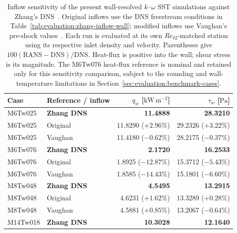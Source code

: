 \begin{table}[H]
    \centering
    \caption[Inflow sensitivity of wall-resolved SST wall loads]{Inflow sensitivity of the present wall-resolved \(k\)--\(\omega\) SST simulations against Zhang's DNS~\cite{zhang2018direct}. Original inflows use the DNS freestream conditions in Table~\ref{tab:evaluation:zhang-inflow-wall}; modified inflows use Vaughan's pre-shock values~\cite[Table~2.2]{vaughan2025thesis}. Each run is evaluated at its own \(Re_{\delta2}\)-matched station using its respective inlet density and velocity. Parentheses give \(100(\mathrm{RANS}-\mathrm{DNS})/\mathrm{DNS}\). Heat-flux is positive into the wall; shear stress is its magnitude. The M6Tw076 heat-flux reference is nominal and retained only for this sensitivity comparison, subject to the rounding and wall-temperature limitations in Section~\ref{sec:evaluation:benchmark-cases}.}
    \label{tab:inflow-comparison}
    \small
    \begin{tabular}{@{}llrr@{}}
        \toprule
        Case & Reference / inflow & \(q_w\) [\(\mathrm{kW\,m^{-2}}\)] & \(\tau_w\) [\(\mathrm{Pa}\)] \\
        \midrule
        M6Tw025 & \textbf{Zhang DNS} & \textbf{11.4888} & \textbf{28.3210} \\
        M6Tw025 & Original & 11.8290 (\(+2.96\%\)) & 29.2326 (\(+3.22\%\)) \\
        M6Tw025 & Vaughan & 11.4180 (\(-0.62\%\)) & 28.2175 (\(-0.37\%\)) \\
        \addlinespace
        M6Tw076 & \textbf{Zhang DNS} & \textbf{2.1720} & \textbf{16.2533} \\
        M6Tw076 & Original & 1.8925 (\(-12.87\%\)) & 15.3712 (\(-5.43\%\)) \\
        M6Tw076 & Vaughan & 1.8585 (\(-14.43\%\)) & 15.1801 (\(-6.60\%\)) \\
        \addlinespace
        M8Tw048 & \textbf{Zhang DNS} & \textbf{4.5495} & \textbf{13.2915} \\
        M8Tw048 & Original & 4.6231 (\(+1.62\%\)) & 13.3289 (\(+0.28\%\)) \\
        M8Tw048 & Vaughan & 4.5881 (\(+0.85\%\)) & 13.2067 (\(-0.64\%\)) \\
        \addlinespace
        M14Tw018 & \textbf{Zhang DNS} & \textbf{10.3028} & \textbf{12.1640} \\

\end{tabular}
\end{table}

